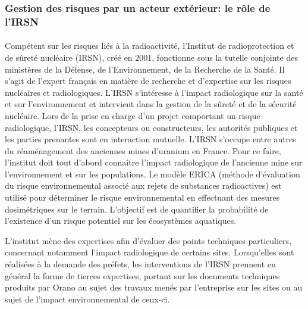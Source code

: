 \documentclass{article}
\begin{document}

\subsubsection{Gestion des risques par un acteur extérieur: le rôle de l’IRSN}

\paragraph{} Compétent sur les risques liés à la radioactivité, l'Institut de radioprotection et de sûreté nucléaire (IRSN), créé en 2001, fonctionne sous la tutelle conjointe des ministères de la Défense, de l’Environnement, de la Recherche de la Santé. Il s’agit de l’expert français en matière de recherche et d’expertise sur les risques nucléaires et radiologiques. L’IRSN s’intéresse à l’impact radiologique sur la santé et sur l'environnement et intervient dans la gestion de la sûreté et de la sécurité nucléaire. Lors de la prise en charge d’un projet comportant un risque radiologique, l’IRSN, les concepteurs ou constructeurs, les autorités publiques et les parties prenantes sont en interaction mutuelle. L’IRSN s’occupe entre autres du réaménagement des anciennes mines d’uranium en France. Pour ce faire, l’institut doit tout d’abord connaître l’impact radiologique de l’ancienne mine sur l’environnement et sur les populations. Le modèle ERICA (méthode d’évaluation du risque environnemental associé aux rejets de substances radioactives) est utilisé pour déterminer le risque environnemental en effectuant des mesures dosimétriques sur le terrain. L’objectif est de quantifier la probabilité de l’existence d’un risque potentiel sur les écosystèmes aquatiques.

L’institut mène des expertises afin d’évaluer des points techniques particuliers, concernant notamment l’impact radiologique de certains sites. Lorsqu’elles sont réalisées à la demande des préfets, les interventions de l’IRSN prennent en général la forme de tierces expertises, portant sur les documents techniques produits par Orano au sujet des travaux menés par l'entreprise sur les sites ou au sujet de l’impact environnemental de ceux-ci.
\end{document}
